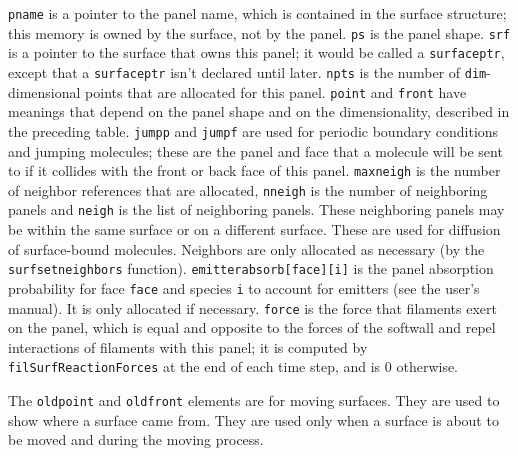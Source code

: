 \documentclass {scrbook}
\newcommand {\ttt} {\texttt}
\begin{document}
\ttt{pname} is a pointer to the panel name, which is contained in the surface structure; this memory is owned by the surface, not by the panel. \ttt{ps} is the panel shape. \ttt{srf} is a pointer to the surface that owns this panel; it would be called a \ttt{surfaceptr}, except that a \ttt{surfaceptr} isn't declared until later. \ttt{npts} is the number of \ttt{dim}-dimensional points that are allocated for this panel. \ttt{point} and \ttt{front} have meanings that depend on the panel shape and on the dimensionality, described in the preceding table. \ttt{jumpp} and \ttt{jumpf} are used for periodic boundary conditions and jumping molecules; these are the panel and face that a molecule will be sent to if it collides with the front or back face of this panel. \ttt{maxneigh} is the number of neighbor references that are allocated, \ttt{nneigh} is the number of neighboring panels and \ttt{neigh} is the list of neighboring panels. These neighboring panels may be within the same surface or on a different surface. These are used for diffusion of surface-bound molecules. Neighbors are only allocated as necessary (by the \ttt{surfsetneighbors} function). \ttt{emitterabsorb[face][i]} is the panel absorption probability for face \ttt{face} and species \ttt{i} to account for emitters (see the user's manual). It is only allocated if necessary. \ttt{force} is the force that filaments exert on the panel, which is equal and opposite to the forces of the softwall and repel interactions of filaments with this panel; it is computed by \ttt{filSurfReactionForces} at the end of each time step, and is 0 otherwise.

The \ttt{oldpoint} and \ttt{oldfront} elements are for moving surfaces. They are used to show where a surface came from. They are used only when a surface is about to be moved and during the moving process.
\end{document}
